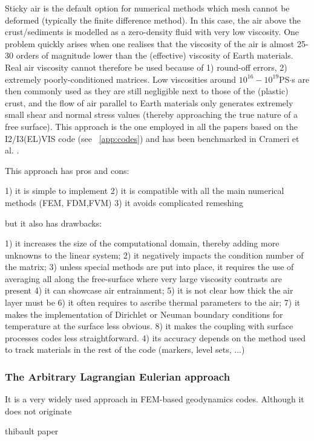 Sticky air is the default option for numerical methods which mesh 
cannot be deformed (typically the finite difference method).
In this case, the air above the crust/sediments is modelled as a zero-density fluid with 
very low viscosity. One problem quickly arises when one realises that the viscosity of the 
air is almost 25-30 orders of magnitude lower than the (effective) viscosity of Earth materials. 
Real air viscosity cannot therefore be used because of 1) round-off errors, 2) extremely 
poorly-conditioned matrices. Low viscosities around $10^{16}-10^{19}$PS$\cdot$s are then 
commonly used as they are still negligible next to those of the (plastic) crust, and the 
flow of air parallel to Earth materials only generates extremely small shear and normal stress values
(thereby approaching the true nature of a free surface). 
This approach is the one employed in all the papers based on the I2/I3(EL)VIS code (see ~\ref{app:codes})
and has been benchmarked in Crameri et al. \cite{crsg12}.

This approach has pros and cons:

1) it is simple to implement 
2) it is compatible with all the main numerical methods (FEM, FDM,FVM)
3) it avoids complicated remeshing

but it also has drawbacks:

1) it increases the size of the computational domain, thereby adding more unknowns to the linear system;
2) it negatively impacts the condition number of the matrix;
3) unless special methods are put into place, it requires the use of averaging all along the free-surface
where very large viscosity contrasts are present
4) it can showcase air entrainment;
5) it is not clear how thick the air layer must be
6) it often requires to ascribe thermal parameters to the air;
7) it makes the implementation of Dirichlet or Neuman boundary conditions for temperature at the surface less
obvious.
8) it makes the coupling with surface processes codes less straightforward.
4) its accuracy depends on the method used to track materials in the rest of the code (markers, level sets, ...)

\subsubsection{The Arbitrary Lagrangian Eulerian approach}

It is a very widely used approach in FEM-based geodynamics codes. Although it does 
not originate 





thibault paper \cite{dumy16} 
\cite{anmp15}
\cite{krwd12}


